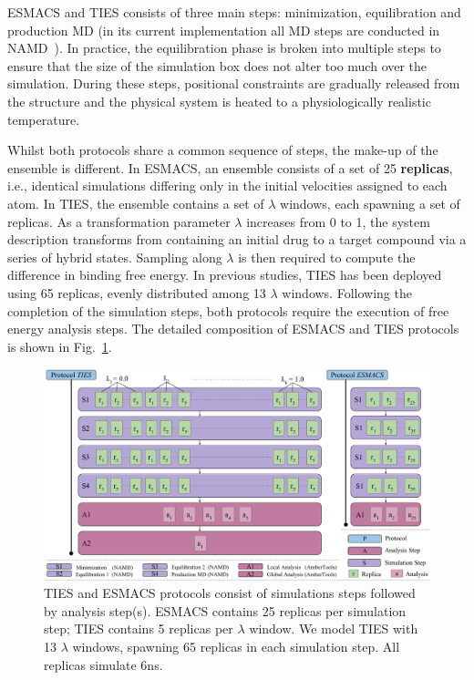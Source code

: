 ESMACS and TIES consists of three main steps: minimization, equilibration and
production MD (in its current implementation all MD steps are conducted in 
NAMD~\cite{Phillips2005}). In practice, the equilibration phase is broken into 
multiple steps to ensure that the size of the simulation box does not alter too 
much over the simulation. During these steps, positional constraints are 
gradually released from the structure and the physical system is heated to a
physiologically realistic temperature.

Whilst both protocols share a common sequence of steps, the make-up of the
ensemble is different. In ESMACS, an ensemble consists of a set of 25
\textbf{replicas}, i.e., identical simulations differing only in the initial
velocities assigned to each atom. In TIES, the ensemble contains a set of
\textbf{$\lambda$} windows, each spawning a set of replicas. As a
transformation parameter $\lambda$ increases from 0 to 1, the system
description transforms from containing an initial drug to a target compound
via a series of hybrid states. Sampling along $\lambda$ is then required to
compute the difference in binding free energy. In previous studies, TIES has
been deployed using 65 replicas, evenly distributed among 13 $\lambda$
windows. Following the completion of the simulation steps, both protocols
require the execution of free energy analysis steps. The detailed composition
of ESMACS and TIES protocols is shown in Fig.~\ref{fig:ties_esmacs_application}.

\begin{figure}
  \centering
  \includegraphics[width=\columnwidth]{figures/ties_esmacs_application_model.pdf}
  \caption{TIES and ESMACS protocols consist of simulations steps followed by
  analysis step(s). ESMACS contains 25 replicas per simulation step; TIES
  contains 5 replicas per $\lambda$ window. We model TIES with 13 $\lambda$
  windows, spawning 65 replicas in each simulation step. All replicas
  simulate 6ns.}\label{fig:ties_esmacs_application}
\up{}
\up{}
\end{figure}


